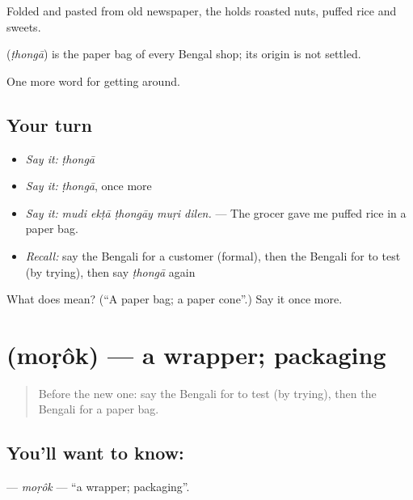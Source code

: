 Folded and pasted from old newspaper, the  holds roasted nuts, puffed rice and sweets.

\begin{cousinweb}
\textbf{} (\emph{ṭhongā}) is the paper bag of every Bengal shop; its origin is not settled.
\end{cousinweb}

\begin{grammarlens}[title={What you've built}]
One more word for getting around.
\end{grammarlens}

\subsection*{Your turn}
\begin{itemize}
\raggedright
  \item \emph{Say it:} \emph{ṭhongā}
  \item \emph{Say it:} \emph{ṭhongā}, once more
  \item \emph{Say it:} \emph{mudi ekṭā ṭhongāy muṛi dilen.} — The grocer gave me puffed rice in a paper bag.
  \item \emph{Recall:} say the Bengali for a customer (formal), then the Bengali for to test (by trying), then say \emph{ṭhongā} again
\end{itemize}

\begin{tcolorbox}[breakable,colback=teal!4,colframe=teal!35!black,title={Before you move on}]
What does  mean? (\textquotedblleft{}A paper bag; a paper cone\textquotedblright{}.) Say it once more.
\end{tcolorbox}
\section[\texorpdfstring{\bn{মোড়ক} (moṛôk)}{মোড়ক (moṛôk)}]{ (moṛôk) — a wrapper; packaging}

\label{lesson:BN-C423-morok}



\begin{quote}
Before the new one: say the Bengali for to test (by trying), then the Bengali for a paper bag.
\end{quote}

\subsection*{You'll want to know: }
\textbf{} — \emph{moṛôk} — \textquotedblleft{}a wrapper; packaging\textquotedblright{}.

